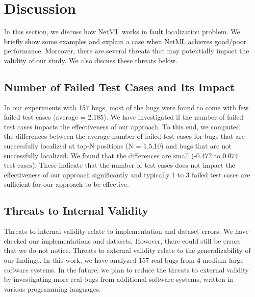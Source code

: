 %



\section{Discussion}
\label{sec:threats}

In this section, we discuss how NetML works in fault localization problem. We briefly show some examples and explain a case when NetML achieves good/poor performance. Moreover, there are several threats that may potentially impact the validity of our study. We also discuss these threats below.






\subsection{Number of Failed Test Cases and Its Impact}

In our experiments with 157 bugs, most of the bugs were found to come with few failed test cases (average = 2.185). We have investigated if the number of failed test cases impacts the effectiveness of our approach. To this end, we computed the differences between the average number of failed test cases for bugs that are successfully localized at top-N positions (N = 1,5,10) and bugs that are not successfully localized. We found that the differences are small (-0.472 to 0.074 test cases). These indicate that the number of test cases does not impact the effectiveness of our approach significantly and typically 1 to 3 failed test cases are sufficient for our approach to be effective.

\subsection{Threats to Internal Validity} 

Threats to internal validity relate to implementation and dataset errors. We have checked our implementations and datasets. However, there could still be errors that we do not notice. Threats to external validity relate to the generalizability of our findings. In this work, we have analyzed 157 real bugs from 4 medium-large software systems. In the future, we plan to reduce the threats to external validity by investigating more real bugs from additional software systems, written in various programming languages. 

